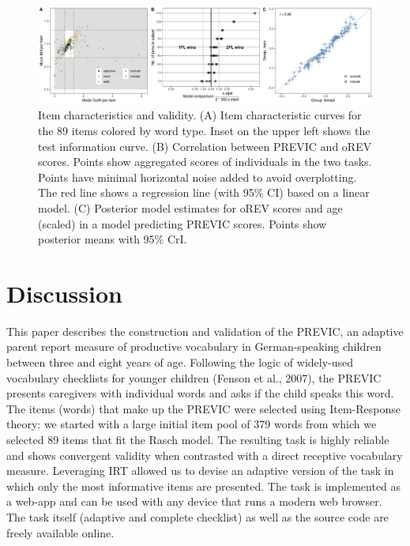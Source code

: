 \documentclass[
  man,floatsintext]{apa6}
\begin{document}
\begin{figure}

{\centering \includegraphics[width=1\linewidth]{../graphs/fig4} 

}

\caption{Item characteristics and validity. (A) Item characteristic curves for the 89 items colored by word type. Inset on the upper left shows the test information curve. (B) Correlation between PREVIC and oREV scores. Points show aggregated scores of individuals in the two tasks. Points have minimal horizontal noise added to avoid overplotting. The red line shows a regression line (with 95\% CI) based on a linear model. (C) Posterior model estimates for oREV scores and age (scaled) in a model predicting PREVIC scores. Points show posterior means with 95\% CrI.}\label{fig:fig4}
\end{figure}

\hypertarget{discussion}{%
\section{Discussion}\label{discussion}}

This paper describes the construction and validation of the PREVIC, an adaptive parent report measure of productive vocabulary in German-speaking children between three and eight years of age. Following the logic of widely-used vocabulary checklists for younger children (Fenson et al., 2007), the PREVIC presents caregivers with individual words and asks if the child speaks this word. The items (words) that make up the PREVIC were selected using Item-Response theory: we started with a large initial item pool of 379 words from which we selected 89 items that fit the Rasch model. The resulting task is highly reliable and shows convergent validity when contrasted with a direct receptive vocabulary measure. Leveraging IRT allowed us to devise an adaptive version of the task in which only the most informative items are presented. The task is implemented as a web-app and can be used with any device that runs a modern web browser. The task itself (adaptive and complete checklist) as well as the source code are freely available online.
\end{document}
